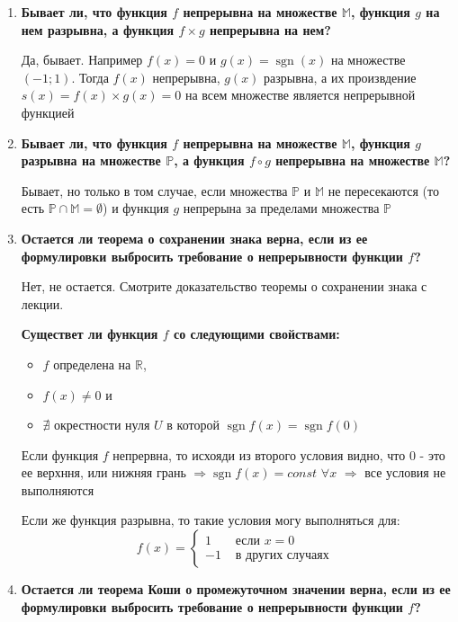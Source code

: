 \documentclass[a4paper,12pt]{article}
\DeclareMathOperator{\sgn}{sgn}
\begin{document}
\begin{enumerate}
{      Нет, не бывает. Если функция $s = f + g$ непрерывна, то функция $g = s - f$ также непрерывна, 
      что противоречит условию
    }
    \item {
      \textbf{Бывает ли, что функция $f$ непрерывна на множестве $\mathbb{M}$, функция $g$ на нем разрывна, а функция $f \times g$ непрерывна на нем?}

      Да, бывает. Например $f(x) = 0$ и $g(x) = \sgn (x)$ на множестве $(-1; 1)$. Тогда $f(x)$ непрерывна,
      $g(x)$ разрывна, а их произвдение $s(x) = f(x)\times g(x) = 0$ на всем множестве является непрерывной
      функцией
    }
    \item {
      \textbf{Бывает ли, что функция $f$ непрерывна на множестве $\mathbb{M}$, функция $g$ разрывна на множестве $\mathbb{P}$, а функция $f \circ g$ непрерывна на множестве $\mathbb{M}$?}

      Бывает, но только в том случае, если множества $\mathbb{P}$ и $\mathbb{M}$ не пересекаются (то есть
      $\mathbb{P}\cap\mathbb{M} = \emptyset$) и функция $g$ непрерына за пределами множества $\mathbb{P}$
    }
    \item {
      \textbf{Остается ли теорема о сохранении знака верна, если из ее формулировки выбросить требование о непрерывности функции $f$?}

      Нет, не остается. Смотрите доказательство теоремы о сохранении знака с лекции.

      \textbf{Существет ли функция $f$ со следующими свойствами:}
      \begin{itemize}
        \item $f$ определена на $\mathbb{R}$,
        \item $f(x) \neq 0$ и
        \item $\nexists$ окрестности нуля $U$ в которой $\sgn f(x) = \sgn f(0)$
      \end{itemize}

      Если функция $f$ непрервна, то исхояди из второго условия видно, что 0 - это ее верхння,
      или нижняя грань $\Rightarrow \sgn f(x) = const$ $\forall x$ $\Rightarrow$ все условия не выполняются

      Если же функция разрывна, то такие условия могу выполняться для:
      \begin{equation}
        f(x) = \begin{cases}
          1 & \text{ если } x = 0 \\
          -1 & \text{ в других случаях }
        \end{cases}
      \end{equation}
    }
    \item {
      \textbf{Остается ли теорема Коши о промежуточном значении верна, если из ее формулировки выбросить требование о непрерывности функции $f$?}

}
\end{enumerate}
\end{document}
